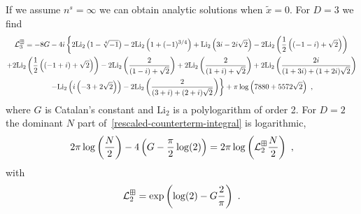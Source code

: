 If we assume $n^{s}=\infty$ we can obtain analytic solutions when $\tilde x=0$.  For $D=3$ we find
\begin{multline}
\mathcal{L}_3^{\boxplus}=-8 G-4 i \left\{2 \text{Li}_2\left(1-\sqrt[4]{-1}\right)-2 \text{Li}_2\left(1+(-1)^{3/4}\right)+\text{Li}_2\left(3 i-2 i
   \sqrt{2}\right)-2 \text{Li}_2\left(\frac{1}{2} \left((-1-i)+\sqrt{2}\right)\right)\right.\\
   \left.+2 \text{Li}_2\left(\frac{1}{2}
   \left((-1+i)+\sqrt{2}\right)\right)-2 \text{Li}_2\left(\frac{2}{(1-i)+\sqrt{2}}\right)+2
   \text{Li}_2\left(\frac{2}{(1+i)+\sqrt{2}}\right)+2 \text{Li}_2\left(\frac{2 i}{(1+3 i)+(1+2 i)
   \sqrt{2}}\right)\right.\\
   \left.-\text{Li}_2\left(i \left(-3+2 \sqrt{2}\right)\right)-2 \text{Li}_2\left(\frac{2}{(3+i)+(2+i)
   \sqrt{2}}\right)\right\}+\pi  \log \left(7880+5572 \sqrt{2}\right)\ ,
   \end{multline}
where $G$ is Catalan's constant and $\text{Li}_2$ is a polylogarithm of order 2.  For $D=2$ the dominant $N$ part of~\eqref{rescaled-counterterm-integral} is logarithmic,
\begin{equation}
2\pi\log\left(\frac{N}{2}\right)-4\left(G-\frac{\pi }{2}\log(2)\right)=2\pi\log\left(\counterterm_2^{\dispersion}\frac{N}{2}\right)\ ,
\end{equation}
with
\begin{equation}
\counterterm_2^\dispersion=\exp\left(\log(2)-G\frac{2}{\pi}\right)\ .
\end{equation}

